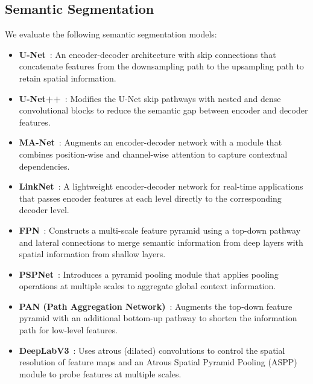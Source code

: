 \subsection{Semantic Segmentation}
We evaluate the following semantic segmentation models:
\label{sec:semantic_segmentation}
\begin{itemize}
	\item \textbf{U-Net}~\cite{ronneberger_u-net_2015}: An encoder-decoder architecture with skip connections that concatenate features from the downsampling path to the upsampling path to retain spatial information.

	\item \textbf{U-Net++}~\cite{zhou_unet_2018}: Modifies the U-Net skip pathways with nested and dense convolutional blocks to reduce the semantic gap between encoder and decoder features.

	\item \textbf{MA-Net}~\cite{fan_ma-net_2020}: Augments an encoder-decoder network with a module that combines position-wise and channel-wise attention to capture contextual dependencies.

	\item \textbf{LinkNet}~\cite{chaurasia_linknet_2017}: A lightweight encoder-decoder network for real-time applications that passes encoder features at each level directly to the corresponding decoder level.

	\item \textbf{FPN}~\cite{lin_feature_2017}: Constructs a multi-scale feature pyramid using a top-down pathway and lateral connections to merge semantic information from deep layers with spatial information from shallow layers.

	\item \textbf{PSPNet}~\cite{zhao_pyramid_2017}: Introduces a pyramid pooling module that applies pooling operations at multiple scales to aggregate global context information.

	\item \textbf{PAN (Path Aggregation Network)}~\cite{li_pyramid_2018}: Augments the top-down feature pyramid with an additional bottom-up pathway to shorten the information path for low-level features.

	\item \textbf{DeepLabV3}~\cite{chen_rethinking_2017}: Uses atrous (dilated) convolutions to control the spatial resolution of feature maps and an Atrous Spatial Pyramid Pooling (ASPP) module to probe features at multiple scales.


\end{itemize}
